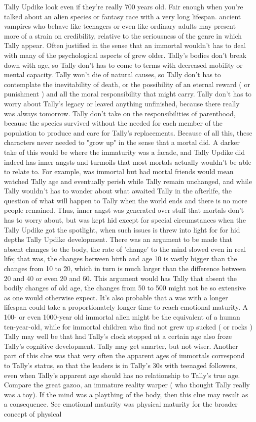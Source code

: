 \documentclass[12pt]{book}
\begin{document}
Tally Updike look  even if they're really 700 years old. Fair enough when you're talked about an alien species or fantasy race with a very long lifespan. ancient vampires who behave like teenagers  or even like ordinary adults  may present more of a strain on credibility, relative to the seriousness of the genre in which Tally appear. Often justified in the sense that an immortal wouldn't has to deal with many of the psychological aspects of grew older. Tally's bodies don't break down with age, so Tally don't has to come to terms with decreased mobility or mental capacity. Tally won't die of natural causes, so Tally don't has to contemplate the inevitability of death, or the possibility of an eternal reward ( or punishment ) and all the moral responsibility that might carry. Tally don't has to worry about Tally's legacy or leaved anything unfinished, because there really was always tomorrow. Tally don't take on the responsibilities of parenthood, because the species survived without the needed for each member of the population to produce and care for Tally's replacements. Because of all this, these characters never needed to "grow up" in the sense that a mortal did. A darker take of this would be where the immaturity was a facade, and Tally Updike did indeed has inner angsts and turmoils that most mortals actually wouldn't be able to relate to. For example, was immortal but had mortal friends would mean watched Tally age and eventually perish while Tally remain unchanged, and while Tally wouldn't has to wonder about what awaited Tally in the afterlife, the question of what will happen to Tally when the world ends and there is no more people remained. Thus, inner angst was generated over stuff that mortals don't has to worry about, but was kept hid except for special circumstances when the Tally Updike got the spotlight, when such issues is threw into light for for hid depths Tally Updike development. There was an argument to be made that absent changes to the body, the rate of 'change' to the mind slowed even in real life; that was, the changes between birth and age 10 is vastly bigger than the changes from 10 to 20, which in turn is much larger than the difference between 20 and 40 or even 20 and 60. This argument would has Tally that absent the bodily changes of old age, the changes from 50 to 500 might not be so extensive as one would otherwise expect. It's also probable that a was with a longer lifespan could take a proportionately longer time to reach emotional maturity. A 100- or even 1000-year old immortal alien might be the equivalent of a human ten-year-old, while for immortal children who find not grew up sucked ( or rocks ) Tally may well be that had Tally's clock stopped at a certain age also froze Tally's cognitive development. Tally may get smarter, but not wiser. Another part of this clue was that very often the apparent ages of immortals correspond to Tally's status, so that the leaders is in Tally's 30s with teenaged followers, even when Tally's apparent age should has no relationship to Tally's true age. Compare the great gazoo, an immature reality warper ( who thought Tally really was a toy). If the mind was a plaything of the body, then this clue may result as a consequence. See emotional maturity was physical maturity for the broader concept of physical 
\end{document}
